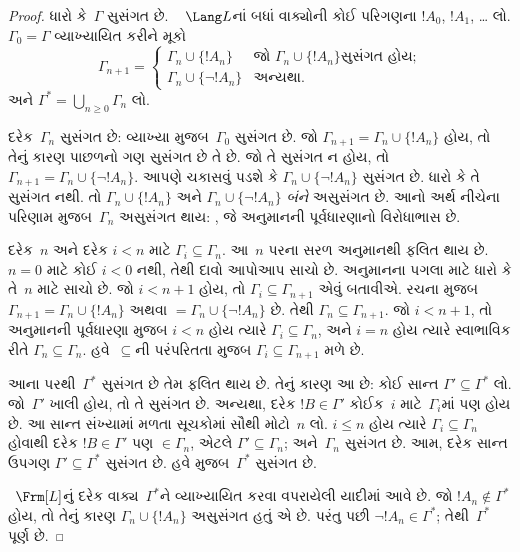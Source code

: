 \begin{proof}
ધારો કે~$\Gamma$ સુસંગત છે. ~ $\Lang L$નાં બધાં વાક્યોની
કોઈ પરિગણના $!A_0$, $!A_1$, \dots{} લો. $\Gamma_0=\Gamma$ વ્યાખ્યાયિત
કરીને મૂકો
\[
\Gamma_{n+1} =
\begin{cases}
\Gamma_n \cup \{ !A_n \} & \textrm{જો $\Gamma_n \cup \{!A_n\}$
  સુસંગત હોય;} \\
\Gamma_n \cup \{ \lnot !A_n \} & \textrm{અન્યથા.}
\end{cases}
\]
અને $\Gamma^*=\bigcup_{n\geq 0}\Gamma_n$ લો.

દરેક~$\Gamma_n$ સુસંગત છે: વ્યાખ્યા મુજબ~$\Gamma_0$ સુસંગત છે. જો
$\Gamma_{n+1}=\Gamma_n\cup\{!A_n\}$ હોય, તો તેનું કારણ પાછળનો ગણ
સુસંગત છે તે છે. જો તે સુસંગત ન હોય, તો
$\Gamma_{n+1}=\Gamma_n\cup\{\lnot !A_n\}$. આપણે ચકાસવું પડશે કે
$\Gamma_n\cup\{\lnot !A_n\}$ સુસંગત છે. ધારો કે તે સુસંગત નથી. તો
$\Gamma_n\cup\{!A_n\}$ અને $\Gamma_n\cup\{\lnot !A_n\}$ \emph{બંને}
અસુસંગત છે. આનો અર્થ નીચેના પરિણામ મુજબ~$\Gamma_n$ અસુસંગત થાય:
%
  ,
જે અનુમાનની પૂર્વધારણાનો વિરોધાભાસ છે.

દરેક~$n$ અને દરેક $i<n$ માટે $\Gamma_i\subseteq\Gamma_n$. આ~$n$ પરના
સરળ અનુમાનથી ફલિત થાય છે. $n=0$ માટે કોઈ $i<0$ નથી, તેથી દાવો આપોઆપ
સાચો છે. અનુમાનના પગલા માટે ધારો કે તે~$n$ માટે સાચો છે. જો $i<n+1$
હોય, તો $\Gamma_i\subseteq\Gamma_{n+1}$ એવું બતાવીએ. રચના મુજબ
$\Gamma_{n+1}=\Gamma_n\cup\{!A_n\}$ અથવા
$=\Gamma_n\cup\{\lnot !A_n\}$ છે. તેથી
$\Gamma_n\subseteq\Gamma_{n+1}$. જો $i<n+1$, તો અનુમાનની પૂર્વધારણા
મુજબ $i<n$ હોય ત્યારે $\Gamma_i\subseteq\Gamma_n$, અને $i=n$ હોય
ત્યારે સ્વાભાવિક રીતે $\Gamma_n\subseteq\Gamma_n$. હવે~$\subseteq$ની
પરંપરિતતા મુજબ $\Gamma_i\subseteq\Gamma_{n+1}$ મળે છે.

આના પરથી~$\Gamma^*$ સુસંગત છે તેમ ફલિત થાય છે. તેનું કારણ આ છે:
કોઈ સાન્ત $\Gamma'\subseteq\Gamma^*$ લો. જો~$\Gamma'$ ખાલી હોય, તો તે
સુસંગત છે. અન્યથા, દરેક $!B\in\Gamma'$ કોઈક~$i$ માટે~$\Gamma_i$માં
પણ હોય છે. આ સાન્ત સંખ્યામાં મળતા સૂચકોમાં સૌથી મોટો~$n$ લો. $i\le n$ હોય ત્યારે
$\Gamma_i\subseteq\Gamma_n$ હોવાથી દરેક $!B\in\Gamma'$ પણ
$\in\Gamma_n$, એટલે $\Gamma'\subseteq\Gamma_n$; અને~$\Gamma_n$
સુસંગત છે. આમ, દરેક સાન્ત ઉપગણ $\Gamma'\subseteq\Gamma^*$ સુસંગત છે. હવે
%
   મુજબ~$\Gamma^*$ સુસંગત
છે.


~$\Frm[L]$નું દરેક વાક્ય~$\Gamma^*$ને વ્યાખ્યાયિત કરવા વપરાયેલી
યાદીમાં આવે છે. જો $!A_n\notin\Gamma^*$ હોય, તો તેનું કારણ
$\Gamma_n\cup\{!A_n\}$ અસુસંગત હતું એ છે. પરંતુ પછી $\lnot !A_n\in
\Gamma^*$; તેથી~$\Gamma^*$ પૂર્ણ છે.
\end{proof}
\endgroup


